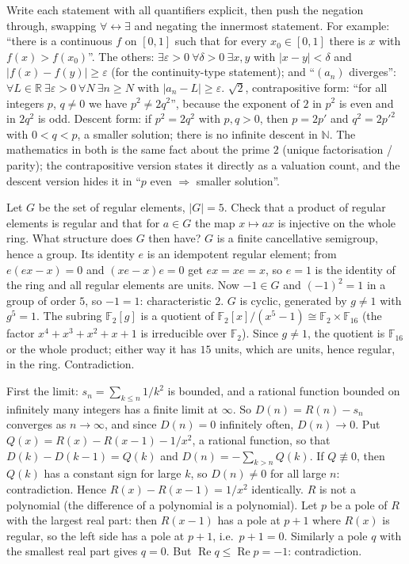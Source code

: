 \documentclass[11pt,a4paper]{article}
\begin{document}

 Write each statement with all quantifiers explicit, then push the negation through, swapping $\forall\leftrightarrow\exists$ and negating the innermost statement. For example: ``there is a continuous $f$ on $[0,1]$ such that for every $x_0\in[0,1]$ there is $x$ with $f(x)>f(x_0)$''.
 The others: $\exists\varepsilon>0\ \forall\delta>0\ \exists x,y$ with $|x-y|<\delta$ and $|f(x)-f(y)|\ge\varepsilon$ (for the continuity-type statement); and ``$(a_n)$ diverges'': $\forall L\in\mathbb R\ \exists\varepsilon>0\ \forall N\ \exists n\ge N$ with $|a_n-L|\ge\varepsilon$.
 $\sqrt2$, contrapositive form: ``for all integers $p$, $q\ne0$ we have $p^2\ne2q^2$'', because the exponent of $2$ in $p^2$ is even and in $2q^2$ is odd. Descent form: if $p^2=2q^2$ with $p,q>0$, then $p=2p'$ and $q^2=2p'^2$ with $0<q<p$, a smaller solution; there is no infinite descent in $\mathbb N$.
 The mathematics in both is the same fact about the prime $2$ (unique factorisation / parity); the contrapositive version states it directly as a valuation count, and the descent version hides it in ``$p$ even $\Rightarrow$ smaller solution''.

 Let $G$ be the set of regular elements, $|G|=5$. Check that a product of regular elements is regular and that for $a\in G$ the map $x\mapsto ax$ is injective on the whole ring. What structure does $G$ then have?
 $G$ is a finite cancellative semigroup, hence a group. Its identity $e$ is an idempotent regular element; from $e(ex-x)=0$ and $(xe-x)e=0$ get $ex=xe=x$, so $e=1$ is the identity of the ring and all regular elements are units. Now $-1\in G$ and $(-1)^2=1$ in a group of order $5$, so $-1=1$: characteristic $2$.
 $G$ is cyclic, generated by $g\ne1$ with $g^5=1$. The subring $\mathbb F_2[g]$ is a quotient of $\mathbb F_2[x]/(x^5-1)\cong\mathbb F_2\times\mathbb F_{16}$ (the factor $x^4+x^3+x^2+x+1$ is irreducible over $\mathbb F_2$). Since $g\ne1$, the quotient is $\mathbb F_{16}$ or the whole product; either way it has $15$ units, which are units, hence regular, in the ring. Contradiction.

 First the limit: $s_n=\sum_{k\le n}1/k^2$ is bounded, and a rational function bounded on infinitely many integers has a finite limit at $\infty$. So $D(n)=R(n)-s_n$ converges as $n\to\infty$, and since $D(n)=0$ infinitely often, $D(n)\to0$.
 Put $Q(x)=R(x)-R(x-1)-1/x^2$, a rational function, so that $D(k)-D(k-1)=Q(k)$ and $D(n)=-\sum_{k>n}Q(k)$. If $Q\not\equiv0$, then $Q(k)$ has a constant sign for large $k$, so $D(n)\ne0$ for all large $n$: contradiction. Hence $R(x)-R(x-1)=1/x^2$ identically.
 $R$ is not a polynomial (the difference of a polynomial is a polynomial). Let $p$ be a pole of $R$ with the largest real part: then $R(x-1)$ has a pole at $p+1$ where $R(x)$ is regular, so the left side has a pole at $p+1$, i.e.\ $p+1=0$. Similarly a pole $q$ with the smallest real part gives $q=0$. But $\operatorname{Re}q\le\operatorname{Re}p=-1$: contradiction.
\end{document}
